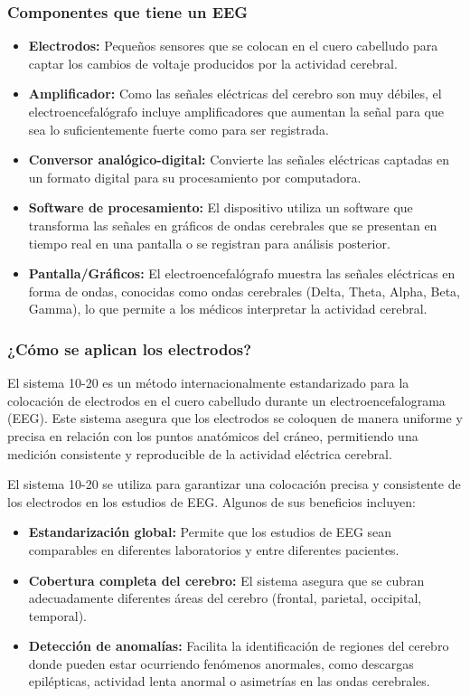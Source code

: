 \documentclass{article}
\begin{document}
\subsubsection{Componentes que tiene un EEG}
\begin{itemize}
    \item \textbf{Electrodos:} Pequeños sensores que se colocan en el cuero cabelludo para captar los cambios de voltaje producidos por la actividad cerebral.
    \item \textbf{Amplificador:} Como las señales eléctricas del cerebro son muy débiles, el electroencefalógrafo incluye amplificadores que aumentan la señal para que sea lo suficientemente fuerte como para ser registrada.
    \item \textbf{Conversor analógico-digital:} Convierte las señales eléctricas captadas en un formato digital para su procesamiento por computadora.
    \item \textbf{Software de procesamiento:} El dispositivo utiliza un software que transforma las señales en gráficos de ondas cerebrales que se presentan en tiempo real en una pantalla o se registran para análisis posterior.
    \item \textbf{Pantalla/Gráficos:} El electroencefalógrafo muestra las señales eléctricas en forma de ondas, conocidas como ondas cerebrales (Delta, Theta, Alpha, Beta, Gamma), lo que permite a los médicos interpretar la actividad cerebral.
\end{itemize}

\subsubsection{¿Cómo se aplican los electrodos?}

El sistema 10-20 es un método internacionalmente estandarizado para la colocación de electrodos en el cuero cabelludo durante un electroencefalograma (EEG). Este sistema asegura que los electrodos se coloquen de manera uniforme y precisa en relación con los puntos anatómicos del cráneo, permitiendo una medición consistente y reproducible de la actividad eléctrica cerebral.

El sistema 10-20 se utiliza para garantizar una colocación precisa y consistente de los electrodos en los estudios de EEG. Algunos de sus beneficios incluyen:

\begin{itemize}
    \item \textbf{Estandarización global:} Permite que los estudios de EEG sean comparables en diferentes laboratorios y entre diferentes pacientes.
    \item \textbf{Cobertura completa del cerebro:} El sistema asegura que se cubran adecuadamente diferentes áreas del cerebro (frontal, parietal, occipital, temporal).
    \item \textbf{Detección de anomalías:} Facilita la identificación de regiones del cerebro donde pueden estar ocurriendo fenómenos anormales, como descargas epilépticas, actividad lenta anormal o asimetrías en las ondas cerebrales.
\end{itemize}
\end{document}
